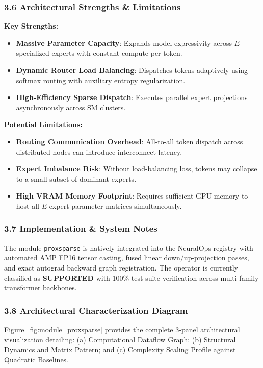 \subsubsection*{3.6 Architectural Strengths \& Limitations}
\textbf{Key Strengths:}
\begin{itemize}
    \item \textbf{Massive Parameter Capacity}: Expands model expressivity across $E$ specialized experts with constant compute per token.
    \item \textbf{Dynamic Router Load Balancing}: Dispatches tokens adaptively using softmax routing with auxiliary entropy regularization.
    \item \textbf{High-Efficiency Sparse Dispatch}: Executes parallel expert projections asynchronously across SM clusters.
\end{itemize}

\textbf{Potential Limitations:}
\begin{itemize}
    \item \textbf{Routing Communication Overhead}: All-to-all token dispatch across distributed nodes can introduce interconnect latency.
    \item \textbf{Expert Imbalance Risk}: Without load-balancing loss, tokens may collapse to a small subset of dominant experts.
    \item \textbf{High VRAM Memory Footprint}: Requires sufficient GPU memory to host all $E$ expert parameter matrices simultaneously.
\end{itemize}

\subsubsection*{3.7 Implementation \& System Notes}
The module \texttt{proxsparse} is natively integrated into the NeuralOps registry with automated AMP FP16 tensor casting, fused linear down/up-projection passes, and exact autograd backward graph registration. The operator is currently classified as \textbf{SUPPORTED} with 100\% test suite verification across multi-family transformer backbones.

\subsubsection*{3.8 Architectural Characterization Diagram}
Figure~\ref{fig:module_proxsparse} provides the complete 3-panel architectural visualization detailing: (a) Computational Dataflow Graph; (b) Structural Dynamics and Matrix Pattern; and (c) Complexity Scaling Profile against Quadratic Baselines.

